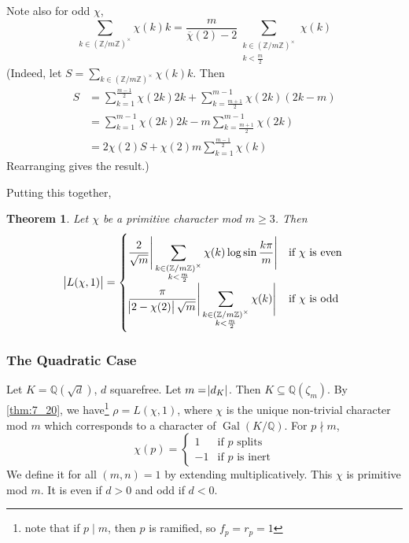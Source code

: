 \documentclass[11pt]{article}
\theoremstyle{definition}
\theoremstyle{plain}
\newtheorem{theorem}[definition]{Theorem}
\theoremstyle{remark}
\DeclareMathOperator{\Gal}{Gal}
\newcommand{\ZZ}{\mathbb{Z}}
\newcommand{\QQ}{\mathbb{Q}}
\begin{document}
\noindent Note also for odd $\chi$,
\begin{equation*}
    \sum_{k \in (\ZZ / m \ZZ)^\times} \chi(k) k = \frac{m}{\overline{\chi}(2) - 2} \sum_{\substack{k \in (\ZZ/m\ZZ)^\times \\ k < \frac{m}{2}}} \chi(k)
\end{equation*}
(Indeed, let $S = \sum_{k \in (\ZZ / m\ZZ)^\times} \chi(k) k$. Then
\begin{align*}
    S
    &= \sum_{k=1}^{\frac{m-1}{2}} \chi(2k) 2k + \sum_{k=\frac{m+1}{2}}^{m-1} \chi(2k) (2k-m)\\
    &= \sum_{k=1}^{m-1} \chi(2k) 2k - m \sum_{k=\frac{m+1}{2}}^{m-1} \chi(2k)\\
    &= 2 \chi(2) S + \chi(2) m \sum_{k=1}^{\frac{m-1}{2}} \chi(k)
\end{align*}
Rearranging gives the result.)

Putting this together,
\begin{theorem}\label{thm:7_26}
    Let $\chi$ be a primitive character mod $m \ge 3$. Then
    \begin{equation*}
        \abs{L(\chi, 1)} = \begin{cases}
            \displaystyle\frac{2}{\sqrt{m}} \Bigg\lvert\sum_{\substack{k \in (\ZZ/m\ZZ)^\times \\ k < \frac{m}{2}}} \chi(k) \log \sin \frac{k \pi}{m} \Bigg\rvert & \text{if } \chi \text{ is even} \\
            \displaystyle\frac{\pi}{\abs{2 - \chi(2)} \sqrt{m}} \Bigg\lvert\sum_{\substack{k \in (\ZZ/m\ZZ)^\times \\ k < \frac{m}{2}}} \chi(k)\Bigg\rvert & \text{if } \chi \text{ is odd}
        \end{cases}
    \end{equation*}
\end{theorem}

\subsubsection*{The Quadratic Case}
Let $K = \QQ(\sqrt{d})$, $d$ squarefree. Let $m = \abs{d_K}$. Then $K \subseteq \QQ(\zeta_m)$. By \autoref{thm:7_20}, we have\footnote{note that if $p \mid m$, then $p$ is ramified, so $f_p = r_p = 1$} $\rho = L(\chi, 1)$, where $\chi$ is the unique non-trivial character mod $m$ which corresponds to a character of $\Gal(K/\QQ)$. For $p \nmid m$,
\begin{equation*}
    \chi(p) = \begin{cases}
        1 & \text{if } p \text{ splits}\\
        -1 & \text{if } p \text{ is inert}
    \end{cases}
\end{equation*}
We define it for all $(m, n) = 1$ by extending multiplicatively. This $\chi$ is primitive mod $m$. It is even if $d > 0$ and odd if $d < 0$.
\end{document}
